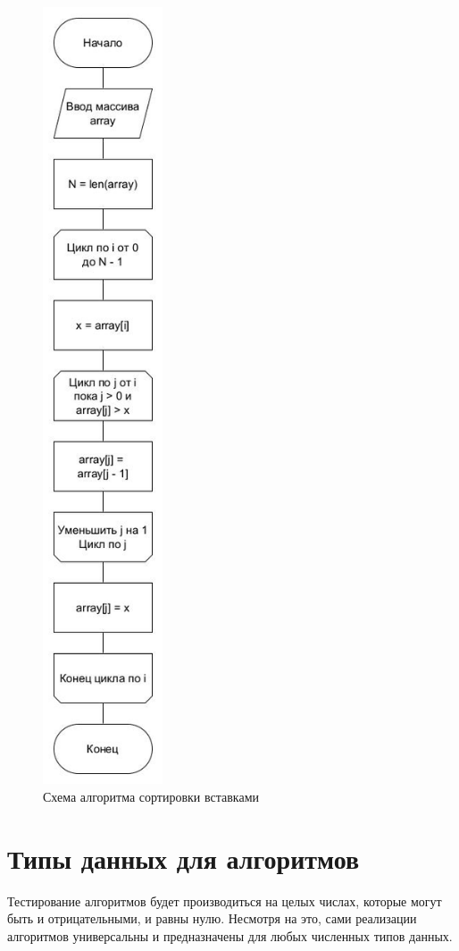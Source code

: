 \begin{figure}[hp]
	\begin{center}
		\includegraphics[height=23cm]{graph/insert.jpg}
	\end{center}
	\caption{Схема алгоритма сортировки вставками}
\end{figure}

\clearpage

\section{Типы данных для алгоритмов}
Тестирование алгоритмов будет производиться на целых числах, 
которые могут быть и отрицательными, и равны нулю. Несмотря на это,
сами реализации алгоритмов универсальны и предназначены для любых численных типов данных.

